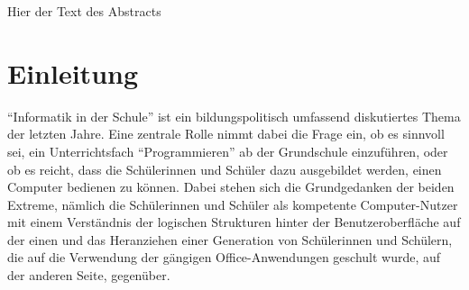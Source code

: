 \documentclass[paper=a4, DIV=calc, BCOR=15mm, twoside=on, onecolumn=on, open = right, titlepage =on, parskip =half, headsepline = on, footsepline = on, chapterprefix = off, appendixprefix = off, fontsize = 12pt, numbers = noenddot, abstract = on]{scrbook}
\begin{document}
\newpage
\thispagestyle{plain}





\thispagestyle{empty}
\cleardoublepage
\newpage
{}
Hier der Text des Abstracts

\newpage
\listoffigures
\newpage
\tableofcontents
\thispagestyle{empty}
\cleardoublepage
\newpage
{}
\par \singlespacing
\chapter{Einleitung}
\onehalfspacing
"`Informatik in der Schule"' ist ein bildungspolitisch umfassend diskutiertes Thema der letzten Jahre. Eine zentrale Rolle nimmt dabei die Frage ein, ob es sinnvoll sei, ein Unterrichtsfach "`Programmieren"' ab der Grundschule einzuführen, oder ob es reicht, dass die Schülerinnen und Schüler dazu ausgebildet werden, einen Computer bedienen zu können. Dabei stehen sich die Grundgedanken der beiden Extreme, nämlich die Schülerinnen und Schüler als kompetente Computer-Nutzer mit einem Verständnis der logischen Strukturen hinter der Benutzeroberfläche auf der einen und das Heranziehen einer Generation von Schülerinnen und Schülern, die auf die Verwendung der gängigen Office-Anwendungen geschult wurde, auf der anderen Seite, gegenüber.
\end{document}
